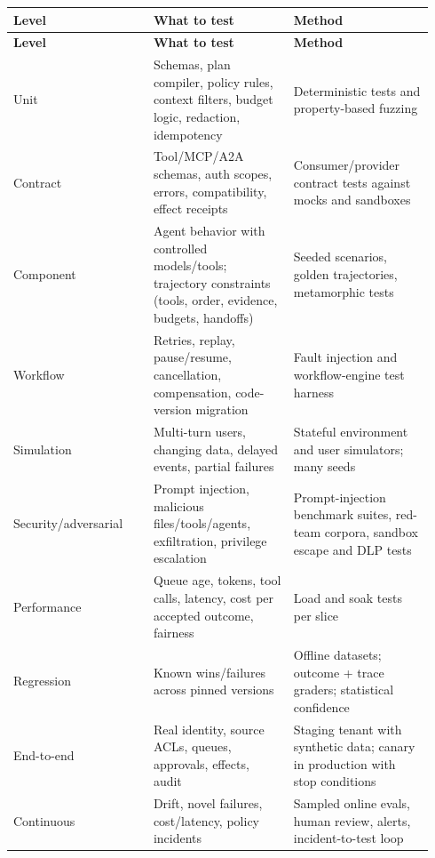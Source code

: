 \BookTableStart
\small
\begin{longtable}{@{}Y{0.3133\linewidth}Y{0.3133\linewidth}Y{0.3133\linewidth}@{}}
\color{white}\bfseries \textbf{Level} & \color{white}\bfseries \textbf{What to test} & \color{white}\bfseries \textbf{Method} \\
\endfirsthead
{}
\color{white}\bfseries \textbf{Level} & \color{white}\bfseries \textbf{What to test} & \color{white}\bfseries \textbf{Method} \\
\endhead
Unit & Schemas, plan compiler, policy rules, context filters, budget logic, redaction, idempotency & Deterministic tests and property-based fuzzing \\
Contract & Tool/MCP/A2A schemas, auth scopes, errors, compatibility, effect receipts & Consumer/provider contract tests against mocks and sandboxes \\
Component & Agent behavior with controlled models/tools; trajectory constraints (tools, order, evidence, budgets, handoffs) & Seeded scenarios, golden trajectories, metamorphic tests \\
Workflow & Retries, replay, pause/resume, cancellation, compensation, code-version migration & Fault injection and workflow-engine test harness \\
Simulation & Multi-turn users, changing data, delayed events, partial failures & Stateful environment and user simulators; many seeds \\
Security/adversarial & Prompt injection, malicious files/tools/agents, exfiltration, privilege escalation & Prompt-injection benchmark suites, red-team corpora, sandbox escape and DLP tests \\
Performance & Queue age, tokens, tool calls, latency, cost per accepted outcome, fairness & Load and soak tests per slice \\
Regression & Known wins/failures across pinned versions & Offline datasets; outcome + trace graders; statistical confidence \\
End-to-end & Real identity, source ACLs, queues, approvals, effects, audit & Staging tenant with synthetic data; canary in production with stop conditions \\
Continuous & Drift, novel failures, cost/latency, policy incidents & Sampled online evals, human review, alerts, incident-to-test loop \\
\end{longtable}
\BookTableEnd

